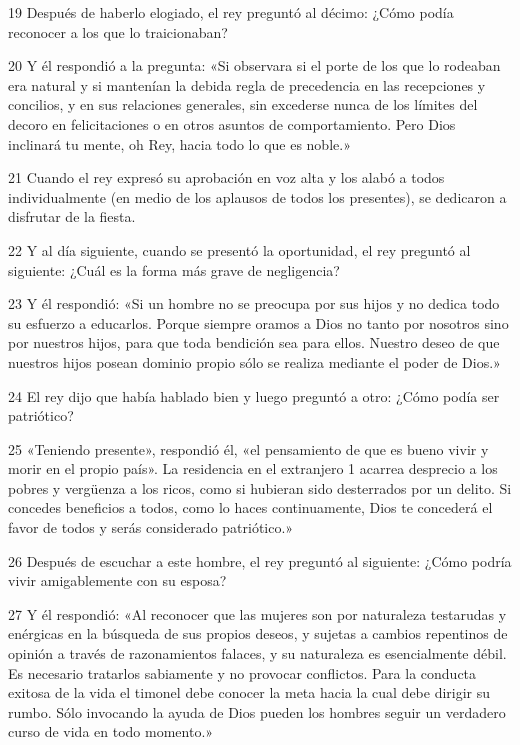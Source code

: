 \par 19 Después de haberlo elogiado, el rey preguntó al décimo: ¿Cómo podía reconocer a los que lo traicionaban?

\par 20 Y él respondió a la pregunta: «Si observara si el porte de los que lo rodeaban era natural y si mantenían la debida regla de precedencia en las recepciones y concilios, y en sus relaciones generales, sin excederse nunca de los límites del decoro en felicitaciones o en otros asuntos de comportamiento. Pero Dios inclinará tu mente, oh Rey, hacia todo lo que es noble.»

\par 21 Cuando el rey expresó su aprobación en voz alta y los alabó a todos individualmente (en medio de los aplausos de todos los presentes), se dedicaron a disfrutar de la fiesta.

\par 22 Y al día siguiente, cuando se presentó la oportunidad, el rey preguntó al siguiente: ¿Cuál es la forma más grave de negligencia?

\par 23 Y él respondió: «Si un hombre no se preocupa por sus hijos y no dedica todo su esfuerzo a educarlos. Porque siempre oramos a Dios no tanto por nosotros sino por nuestros hijos, para que toda bendición sea para ellos. Nuestro deseo de que nuestros hijos posean dominio propio sólo se realiza mediante el poder de Dios.»

\par 24 El rey dijo que había hablado bien y luego preguntó a otro: ¿Cómo podía ser patriótico?

\par 25 «Teniendo presente», respondió él, «el pensamiento de que es bueno vivir y morir en el propio país». La residencia en el extranjero 1 acarrea desprecio a los pobres y vergüenza a los ricos, como si hubieran sido desterrados por un delito. Si concedes beneficios a todos, como lo haces continuamente, Dios te concederá el favor de todos y serás considerado patriótico.»

\par 26 Después de escuchar a este hombre, el rey preguntó al siguiente: ¿Cómo podría vivir amigablemente con su esposa?

\par 27 Y él respondió: «Al reconocer que las mujeres son por naturaleza testarudas y enérgicas en la búsqueda de sus propios deseos, y sujetas a cambios repentinos de opinión a través de razonamientos falaces, y su naturaleza es esencialmente débil. Es necesario tratarlos sabiamente y no provocar conflictos. Para la conducta exitosa de la vida el timonel debe conocer la meta hacia la cual debe dirigir su rumbo. Sólo invocando la ayuda de Dios pueden los hombres seguir un verdadero curso de vida en todo momento.»

